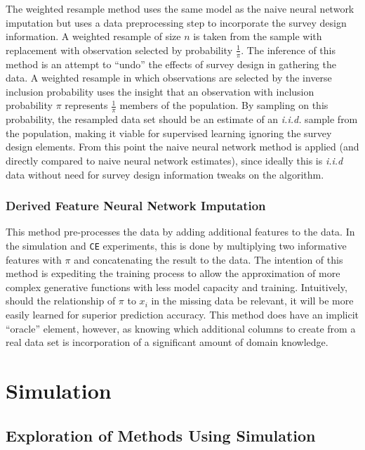 \documentclass[12pt,twoside]{reedthesis}
\begin{document}
The weighted resample method uses the same model as the naive neural
network imputation but uses a data preprocessing step to incorporate the
survey design information. A weighted resample of size \(n\) is taken
from the sample with replacement with observation selected by
probability \(\frac{1}{\pi}\). The inference of this method is an
attempt to ``undo'' the effects of survey design in gathering the data.
A weighted resample in which observations are selected by the inverse
inclusion probability uses the insight that an observation with
inclusion probability \(\pi\) represents \(\frac{1}{\pi}\) members of
the population. By sampling on this probability, the resampled data set
should be an estimate of an \emph{i.i.d.} sample from the population,
making it viable for supervised learning ignoring the survey design
elements. From this point the naive neural network method is applied
(and directly compared to naive neural network estimates), since ideally
this is \emph{i.i.d} data without need for survey design information
tweaks on the algorithm.

\subsection{Derived Feature Neural Network
Imputation}\label{derived-feature-neural-network-imputation}

This method pre-processes the data by adding additional features to the
data. In the simulation and \texttt{CE} experiments, this is done by
multiplying two informative features with \(\pi\) and concatenating the
result to the data. The intention of this method is expediting the
training process to allow the approximation of more complex generative
functions with less model capacity and training. Intuitively, should the
relationship of \(\pi\) to \(x_i\) in the missing data be relevant, it
will be more easily learned for superior prediction accuracy. This
method does have an implicit ``oracle'' element, however, as knowing
which additional columns to create from a real data set is incorporation
of a significant amount of domain knowledge.

\chapter{Simulation}\label{simulation}

\section{Exploration of Methods Using
Simulation}\label{exploration-of-methods-using-simulation}
\end{document}
